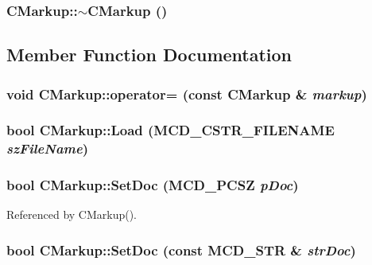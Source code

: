 \subsubsection[$\sim$CMarkup]{\setlength{\rightskip}{0pt plus 5cm}CMarkup::$\sim$CMarkup ()\hspace{0.3cm}{\tt  [inline]}}\label{classCMarkup_8aa2cd9b38b3e173d2149914c59eb2b7}




\subsection{Member Function Documentation}
\subsubsection[operator=]{\setlength{\rightskip}{0pt plus 5cm}void CMarkup::operator= (const {\bf CMarkup} \& {\em markup})}\label{classCMarkup_3feb577bf5483591ac318ecf19cc6577}


\subsubsection[Load]{\setlength{\rightskip}{0pt plus 5cm}bool CMarkup::Load (MCD\_\-CSTR\_\-FILENAME {\em szFileName})}\label{classCMarkup_c7604e24564eac2dce702f7fbaf430a6}


\subsubsection[SetDoc]{\setlength{\rightskip}{0pt plus 5cm}bool CMarkup::SetDoc (MCD\_\-PCSZ {\em pDoc})}\label{classCMarkup_3f7b4f882a3ba216fdaf21b59778869d}




Referenced by CMarkup().
\subsubsection[SetDoc]{\setlength{\rightskip}{0pt plus 5cm}bool CMarkup::SetDoc (const MCD\_\-STR \& {\em strDoc})}\label{classCMarkup_785043b375dbe831b700722518dcd29f}


